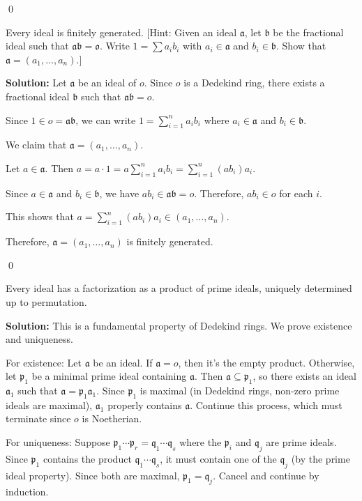 \qed
\begin{problembox}
Every ideal is finitely generated. [Hint: Given an ideal $\mathfrak{a}$, let $\mathfrak{b}$ be the fractional ideal such that $\mathfrak{a}\mathfrak{b} = \mathfrak{o}$. Write $1 = \sum a_i b_i$ with $a_i \in \mathfrak{a}$ and $b_i \in \mathfrak{b}$. Show that $\mathfrak{a} = (a_1, \ldots, a_n)$.]
\end{problembox}

\noindent\textbf{Solution:}
Let $\mathfrak{a}$ be an ideal of $o$. Since $o$ is a Dedekind ring, there exists a fractional ideal $\mathfrak{b}$ such that $\mathfrak{a}\mathfrak{b} = o$.

Since $1 \in o = \mathfrak{a}\mathfrak{b}$, we can write $1 = \sum_{i=1}^n a_i b_i$ where $a_i \in \mathfrak{a}$ and $b_i \in \mathfrak{b}$.

We claim that $\mathfrak{a} = (a_1, \ldots, a_n)$.

Let $a \in \mathfrak{a}$. Then $a = a \cdot 1 = a \sum_{i=1}^n a_i b_i = \sum_{i=1}^n (a b_i) a_i$.

Since $a \in \mathfrak{a}$ and $b_i \in \mathfrak{b}$, we have $a b_i \in \mathfrak{a}\mathfrak{b} = o$. Therefore, $a b_i \in o$ for each $i$.

This shows that $a = \sum_{i=1}^n (a b_i) a_i \in (a_1, \ldots, a_n)$.

Therefore, $\mathfrak{a} = (a_1, \ldots, a_n)$ is finitely generated.


\qed
\begin{problembox}
Every ideal has a factorization as a product of prime ideals, uniquely determined up to permutation.
\end{problembox}

\noindent\textbf{Solution:}
This is a fundamental property of Dedekind rings. We prove existence and uniqueness.

For existence: Let $\mathfrak{a}$ be an ideal. If $\mathfrak{a} = o$, then it's the empty product. Otherwise, let $\mathfrak{p}_1$ be a minimal prime ideal containing $\mathfrak{a}$. Then $\mathfrak{a} \subseteq \mathfrak{p}_1$, so there exists an ideal $\mathfrak{a}_1$ such that $\mathfrak{a} = \mathfrak{p}_1 \mathfrak{a}_1$. Since $\mathfrak{p}_1$ is maximal (in Dedekind rings, non-zero prime ideals are maximal), $\mathfrak{a}_1$ properly contains $\mathfrak{a}$. Continue this process, which must terminate since $o$ is Noetherian.

For uniqueness: Suppose $\mathfrak{p}_1 \cdots \mathfrak{p}_r = \mathfrak{q}_1 \cdots \mathfrak{q}_s$ where the $\mathfrak{p}_i$ and $\mathfrak{q}_j$ are prime ideals. Since $\mathfrak{p}_1$ contains the product $\mathfrak{q}_1 \cdots \mathfrak{q}_s$, it must contain one of the $\mathfrak{q}_j$ (by the prime ideal property). Since both are maximal, $\mathfrak{p}_1 = \mathfrak{q}_j$. Cancel and continue by induction.


